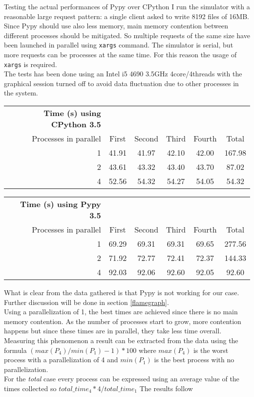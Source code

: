 Testing the actual performances of Pypy over CPython I run the simulator with a
reasonable large request pattern: a single client asked to write 8192 files of
16MB. Since Pypy should use also less memory, main memory contention between
different processes should be mitigated. So multiple requests of the same size
have been launched in parallel using \texttt{xargs} command. The simulator is
serial, but more requests can be processes at the same time. For this reason the
usage of \texttt{xargs} is required. \\
The tests has been done using an Intel i5 4690 3.5GHz 4core/4threads with the
graphical session turned off to avoid data fluctuation due to other processes in
the system.

\vspace{0.5cm} 
\begin{tabular}{r | c | c | c | c | c}
    \textbf{Time (s) using CPython 3.5} & & & & &\\
    Processes in parallel & First & Second & Third & Fourth & Total \\\hline
    1 & 41.91 & 41.97 & 42.10 & 42.00 & 167.98 \\
    2 & 43.61 & 43.32 & 43.40 & 43.70 & 87.02 \\
    4 & 52.56 & 54.32 & 54.27 & 54.05 & 54.32 \\
\end{tabular}
\vspace{0.5cm}

\vspace{0.5cm} 
\begin{tabular}{r | c | c | c | c | c}
    \textbf{Time (s) using Pypy 3.5} & & & & \\
    Processes in parallel & First & Second & Third & Fourth & Total \\\hline
    1 & 69.29 & 69.31 & 69.31 & 69.65 & 277.56 \\
    2 & 71.92 & 72.77 & 72.41 & 72.37 & 144.33 \\
    4 & 92.03 & 92.06 & 92.60 & 92.05 & 92.60 \\
\end{tabular}
\vspace{0.5cm}

What is clear from the data gathered is that Pypy is not working for our case.
Further discussion will be done in section \ref{flamegraph}. \\
Using a parallelization of 1, the best times are achieved since there is no main
memory contention. As the number of processes start to grow, more contention
happens but since these times are in parallel, they take less time overall. \\
Measuring this phenomenon a result can be extracted from the data using the formula
$(max(P_4) / min(P_1) - 1) *100$ where $max(P_4)$ is the worst process with a
parallelization of 4 and $min(P_1)$ is the best process with no
parallelization.\\
For the \textit{total} case every process can be expressed using an average
value of the times collected so $total\_time_4 * 4 / total\_time_1$
The results follow


